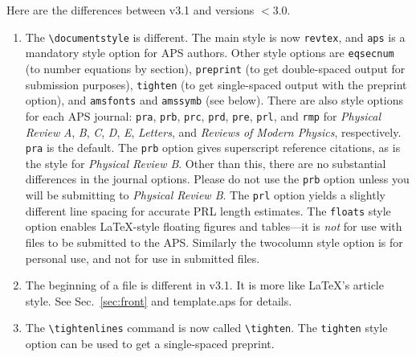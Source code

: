 Here are the differences between \REVTeX{} v3.1 and versions $<$3.0.
\begin{enumerate}
\item The \verb+\documentstyle+ is different. The main style is now
\verb+revtex+, and \verb+aps+ is a mandatory style option for APS
authors. Other
style options are \verb+eqsecnum+ (to number equations by section),
\verb+preprint+ (to get double-spaced output for submission purposes),
\verb+tighten+ (to get single-spaced output with the preprint option),
and \verb+amsfonts+ and \verb+amssymb+ (see below).
There are also style options for each APS journal: \verb+pra+, \verb+prb+,
\verb+prc+, \verb+prd+,
\verb+pre+, \verb+prl+, and \verb+rmp+ for {\it Physical
Review\/} {\it A}, {\it B}, {\it C}, {\it D}, {\it E}, {\it Letters},
and {\it Reviews of Modern Physics}, respectively. \verb+pra+ is the
default. 
The \verb+prb+
option gives superscript
reference citations, as is the style for {\it Physical Review B}.
Other than this, there are no substantial differences in the journal options.
Please do not use the \verb+prb+ option unless you
will be submitting to {\it Physical Review B}.
The \verb+prl+ option yields a slightly different line spacing for accurate
PRL length estimates.
The \verb+floats+ style option enables \LaTeX{}-style floating figures and
tables---it is {\it not\/} for use with files to be submitted to the
APS. Similarly the twocolumn style option is for personal use, and not
for use in submitted files. 

\item The beginning of a file is different in v3.1. It is more like \LaTeX{}'s
article style.
See Sec.\ \ref{sec:front} and template.aps for details.

\item The \verb+\tightenlines+ command is now called \verb+\tighten+.
The \verb+tighten+ style option can be used to get a single-spaced
preprint.



\end{enumerate}
